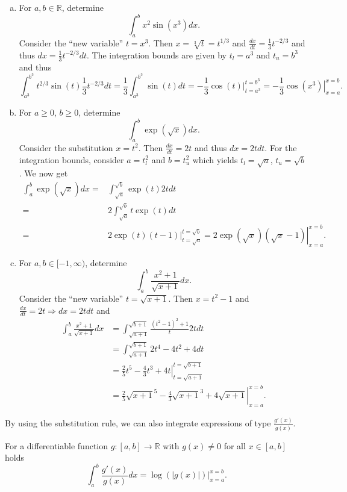 \begin{example}
\begin{enumerate}[a)]
\item For $a,b\in\mathbb{R}$, determine
\[\int_a^bx^2\sin(x^3)dx.\]
Consider the ``new variable'' $t=x^3$. Then $x=\sqrt[3]{t}=t^{1/3}$ and $\frac{dx}{dt}=\frac13t^{-2/3}$ and thus $dx=\frac13t^{-2/3}dt$. The integration bounds are given by $t_l=a^3$ and $t_u=b^3$ and thus
\[\int_{a^3}^{b^3}t^{2/3}\sin(t)\frac13t^{-2/3}dt=\frac13\int_{a^3}^{b^3}\sin(t)dt=-\frac13\left.\cos(t)\right|_{t=a^3}^{t=b^3}=-\frac13\left.\cos(x^3)\right|_{x=a}^{x=b}.\]
 \item For $a\geq0$, $b\geq0$, determine
\[\int_a^b\exp(\sqrt{x})dx.\]
Consider the substitution $x=t^2$. Then $\frac{dx}{dt}=2t$ and thus $dx=2tdt$. For the integration bounds, consider $a=t_l^2$ and $b=t_u^2$ which yields $t_l=\sqrt{a}$, $t_u=\sqrt{b}$. We now get
\[\begin{aligned}
\int_a^b\exp(\sqrt{x})dx=&\int_{\sqrt{a}}^{\sqrt{b}}\exp(t)2tdt\\=&2\int_{\sqrt{a}}^{\sqrt{b}}t\exp(t)dt\\
=&\left.2\exp(t)(t-1)\right|_{t=\sqrt{a}}^{t=\sqrt{b}}
=\left.2\exp(\sqrt{x})(\sqrt{x}-1)\right|_{x={a}}^{x={b}}.
\end{aligned}
\]
\item For $a,b\in[-1,\infty)$, determine
\[\int_a^b\frac{x^2+1}{\sqrt{x+1}}dx.\]
Consider the ``new variable'' $t=\sqrt{x+1}$. Then $x=t^2-1$ and $\frac{dx}{dt}=2t\Rightarrow dx=2tdt$ and
\[
\begin{aligned}
\int_a^b\frac{x^2+1}{\sqrt{x+1}}dx&=\int_{\sqrt{a+1}}^{\sqrt{b+1}}\frac{(t^2-1)^2+1}{t}2tdt\\
&=\int_{\sqrt{a+1}}^{\sqrt{b+1}}2t^4-4t^2+4dt\\
&=\left.\frac25t^5-\frac43t^3+4t\right|_{t=\sqrt{a+1}}^{t=\sqrt{b+1}}\\
&=\left.\frac25\sqrt{x+1}^5-\frac43\sqrt{x+1}^3+4\sqrt{x+1}\right|_{x=a}^{x=b}.
\end{aligned}
\]
\end{enumerate}
\end{example}
By using the substitution rule, we can also integrate expressions of type $\frac{g'(x)}{g(x)}$.



\begin{Corollary}{}
For a differentiable function $g:[a,b]\to\mathbb{R}$ with $g(x)\neq0$ for all $x\in[a,b]$ holds
\[\int_a^b\frac{g'(x)}{g(x)}dx=\left.\log(|g(x)|)\right|_{x=a}^{x=b}.\]
\end{Corollary}
\whiteskip

